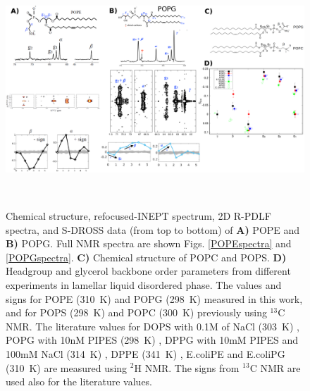 \documentclass[aps,prl,superscriptaddress,twocolumn]{revtex4}
\begin{document}
\begin{figure}[]
  \centering
   \includegraphics[width=18.0cm]{./Figs/figure1.eps}
   \caption{\label{HGorderParameters}
     Chemical structure, refocused-INEPT spectrum, 2D R-PDLF spectra, and S-DROSS data (from top to bottom) of {\bf A)} POPE  and {\bf B)} POPG.
      Full NMR spectra are shown Figs. \ref{POPEspectra} and \ref{POPGspectra}.
     {\bf C)} Chemical structure of POPC and POPS.
    {\bf D)} Headgroup and glycerol backbone order parameters from different experiments in lamellar liquid disordered phase.
    The values and signs for POPE (310~K) and POPG (298~K)
    measured in this work, and for POPS (298~K) \cite{antila19} and POPC (300~K) \cite{ferreira13,ferreira16}
    previously using $^{13}$C NMR. The literature values for
    DOPS with 0.1M of NaCl (303~K) \cite{browning80},
    POPG with 10nM PIPES (298~K) \cite{borle85},
    DPPG with 10mM PIPES and 100mM NaCl (314~K) \cite{wohlgemuth80}, 
    DPPE (341~K) \cite{seelig76},
    E.coliPE and E.coliPG (310~K) \cite{gally81}
    are measured using $^2$H NMR. The signs from $^{13}$C NMR are used also for the literature values.
   }
    \\
\end{figure}
\end{document}
